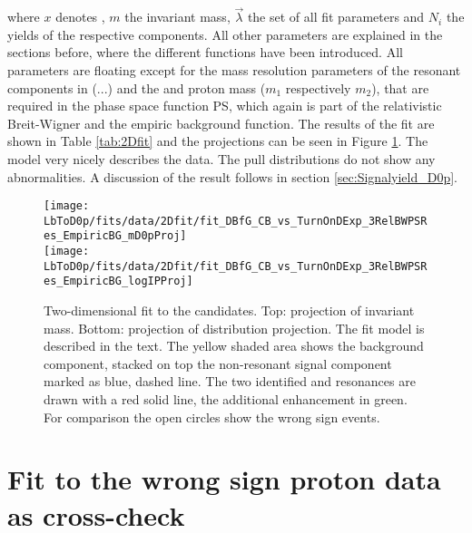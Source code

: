 where $x$ denotes \logIP, $m$ the invariant \Dz\proton mass, $\vec{\lambda}$ the set of all fit parameters and $N_i$ the yields of the respective components.
All other parameters are explained in the sections before, where the different functions have been introduced.
All parameters are floating except for the mass resolution parameters of the resonant components in \RES(...) and the \Dz and proton mass ($m_1$ respectively $m_2$), that are required in the phase space function PS, which again is part of the relativistic Breit-Wigner and the empiric background function. 
The results of the fit are shown in Table \ref{tab:2Dfit} and the projections can be seen in Figure \ref{fig:fit2D}.
The model very nicely describes the data.
The pull distributions do not show any abnormalities.
A discussion of the result follows in section \ref{sec:Signalyield_D0p}.
\begin{figure}[tb]
	\centering
	\texttt{[image: LbToD0p/fits/data/2Dfit/fit\_DBfG\_CB\_vs\_TurnOnDExp\_3RelBWPSRes\_EmpiricBG\_mD0pProj]} \\
	\texttt{[image: LbToD0p/fits/data/2Dfit/fit\_DBfG\_CB\_vs\_TurnOnDExp\_3RelBWPSRes\_EmpiricBG\_logIPProj]}
	\caption{Two-dimensional fit to the \LbToDpmunuX candidates. Top: projection of invariant \Dz\proton mass. Bottom: projection of \logIP distribution projection.
             The fit model is described in the text.
             The yellow shaded area shows the background component, stacked on top the non-resonant signal component marked as blue, dashed line.
             The two identified \LcResI and \LcResII resonances are drawn with a red solid line, the additional enhancement in green.
             For comparison the open circles show the wrong sign events.}
	\label{fig:fit2D}
\end{figure}


\section{Fit to the wrong sign proton data as cross-check}

